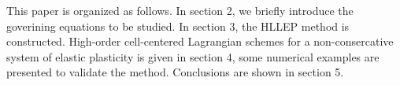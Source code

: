 \documentclass{article}
\theoremstyle{plain}\newtheorem{definition}{\sc{Definition}}
\theoremstyle{defination}\newtheorem{example}{Example}[section]
\numberwithin{equation}{section}
\numberwithin{table}{section}
\begin{document}
%
%
%
This paper is organized as follows. In section 2, we briefly introduce the goverining equations to be studied. In section 3, the HLLEP method is constructed.  High-order cell-centered Lagrangian schemes for a non-consercative system of elastic plasticity is given in section 4, some numerical examples are presented to validate the method.  Conclusions are shown in section 5.
\end{document}
